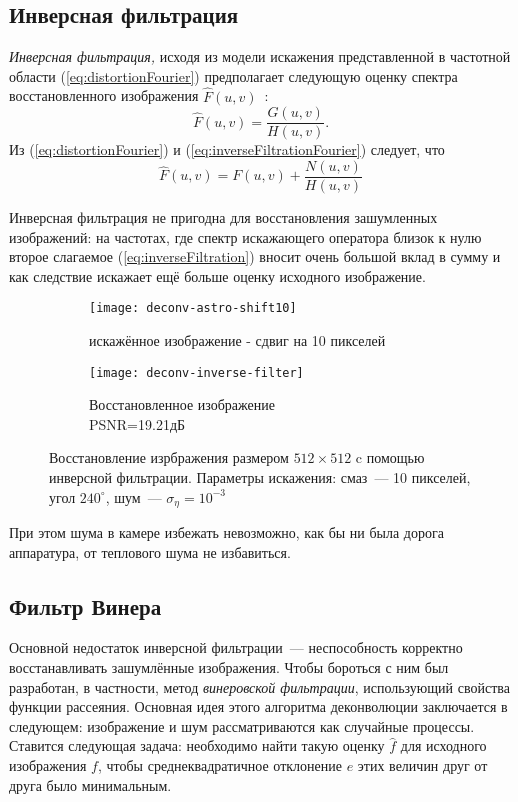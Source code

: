 \subsection{Инверсная фильтрация}
\textit{Инверсная фильтрация,} исходя из модели искажения представленной в частотной области (\ref{eq:distortionFourier}) предполагает следующую оценку спектра восстановленного изображения $\hat{F}(u,v)$~\cite[стр.~411]{gonsalesDigital2012}:
\begin{equation}\label{eq:inverseFiltrationFourier}
\hat{F}(u,v) = \frac{G(u,v)}{H(u,v)}.
\end{equation}
Из (\ref{eq:distortionFourier}) и (\ref{eq:inverseFiltrationFourier}) следует, что
\begin{equation}\label{eq:inverseFiltration}
\hat{F}(u,v) = F(u,v) + \frac{N(u,v)}{H(u,v)}
\end{equation}

Инверсная фильтрация не пригодна для восстановления зашумленных изображений: на частотах, где спектр искажающего оператора близок к нулю второе слагаемое (\ref{eq:inverseFiltration}) вносит очень большой вклад в сумму и как следствие искажает ещё больше оценку исходного изображение.
\begin{figure}
	\begin{subfigure}[b]{0.5\textwidth}
		\texttt{[image: deconv-astro-shift10]}
		\caption{искажённое изображение - сдвиг на 10 пикселей}
		\label{fig:astroShift10}
	\end{subfigure}%
	\begin{subfigure}[b]{0.5\textwidth}
		\texttt{[image: deconv-inverse-filter]}
		\caption{Восстановленное изображение\\ PSNR=19.21дБ}
		\label{fig:astroInverseRestored}
	\end{subfigure}%
	\caption{Восстановление изрбражения размером $512\times 512$ c помощью инверсной фильтрации. Параметры искажения: смаз~--- 10 пикселей, угол $240^\circ$, шум~--- $\sigma_\eta=10^{-3}$}
\end{figure}
При этом шума в камере избежать невозможно, как бы ни была дорога аппаратура, от теплового шума не избавиться.

\subsection{Фильтр Винера}
Основной недостаток инверсной фильтрации~--- неспособность корректно восстанавливать зашумлённые изображения. Чтобы бороться с ним был разработан, в частности, метод \textit{винеровской фильтрации}, использующий свойства функции рассеяния. Основная идея этого алгоритма деконволюции заключается в следующем: изображение и шум рассматриваются как случайные процессы. Ставится следующая задача: необходимо найти такую оценку $\hat{f}$ для исходного изображения $f$, чтобы среднеквадратичное отклонение $e$ этих величин друг от друга было минимальным.

